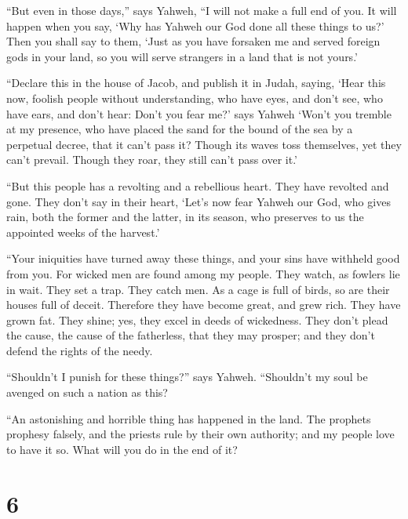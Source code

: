  ``But even in those days,'' says Yahweh, ``I will not
make a full end of you.  It will happen when you say,
`Why has Yahweh our God done all these things to us?' Then you shall say
to them, `Just as you have forsaken me and served foreign gods in your
land, so you will serve strangers in a land that is not yours.'

 ``Declare this in the house of Jacob, and publish it in
Judah, saying,  `Hear this now, foolish people without
understanding, who have eyes, and don't see, who have ears, and don't
hear:  Don't you fear me?' says Yahweh `Won't you tremble
at my presence, who have placed the sand for the bound of the sea by a
perpetual decree, that it can't pass it? Though its waves toss
themselves, yet they can't prevail. Though they roar, they still can't
pass over it.'

 ``But this people has a revolting and a rebellious
heart. They have revolted and gone.  They don't say in
their heart, `Let's now fear Yahweh our God, who gives rain, both the
former and the latter, in its season, who preserves to us the appointed
weeks of the harvest.'

 ``Your iniquities have turned away these things, and
your sins have withheld good from you.  For wicked men
are found among my people. They watch, as fowlers lie in wait. They set
a trap. They catch men.  As a cage is full of birds, so
are their houses full of deceit. Therefore they have become great, and
grew rich.  They have grown fat. They shine; yes, they
excel in deeds of wickedness. They don't plead the cause, the cause of
the fatherless, that they may prosper; and they don't defend the rights
of the needy.

 ``Shouldn't I punish for these things?'' says Yahweh.
``Shouldn't my soul be avenged on such a nation as this?

 ``An astonishing and horrible thing has happened in the
land.  The prophets prophesy falsely, and the priests
rule by their own authority; and my people love to have it so. What will
you do in the end of it?

\hypertarget{section-5}{%
\section{6}\label{section-5}}

